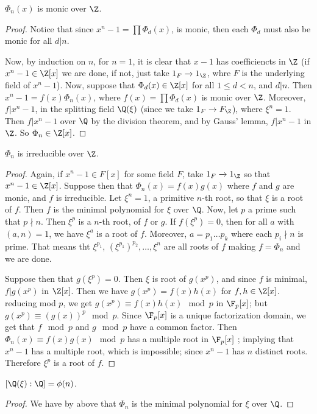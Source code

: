 \begin{lemma}\label{1.7.3}
    $\Phi_n(x)$ is monic over $\Z$.
\end{lemma}
\begin{proof}
    Notice that since $x^n-1=\prod{\Phi_d(x)}$, is monic, then each $\Phi_d$
    must also be monic for all  $d|n$.

    Now, by induction on $n$, for  $n=1$, it is clear that  $x-1$ has
    coefficiencts in  $\Z$  (if $x^n-1 \in \Z[x]$ we are done, if not, just take
    $1_F \xrightarrow{} 1_\Z$, whre $F$ is the underlying field of  $x^n-1$).
    Now, suppose that $\Phi_d(x) \in \Z[x]$ for all $1 \leq d <n$, and  $d|n$.
    Then  $x^n-1=f(x)\Phi_n(x)$, where $f(x)=\prod{\Phi_d(x)}$ is monic over
    $\Z$. Moreover,  $f|x^n-1$, in the splitting field $\Q(\xi)$ (since we take
    $1_F \xrightarrow{} F_\Z$), where $\xi^n=1$. Then  $f|x^n-1$ over  $\Q$ by
    the division theorem, and by Gauss' lemma, $f|x^n-1$ in $\Z$. So $\Phi_n \in
    \Z[x]$.
\end{proof}

\begin{theorem}\label{1.7.4}
    $\Phi_n$ is irreducible over  $\Z$.
\end{theorem}
\begin{proof}
    Again, if $x^n-1 \in F[x]$ for some field $F$, take  $1_F \xrightarrow{}
    1_\Z$ so that $x^n-1 \in \Z[x]$. Suppose then that $\Phi_n(x)=f(x)g(x)$
    where $f$ and  $g$ are monic, and  $f$ is irreducible. Let $\xi^n=1$, a
    primitive $n$-th root, so that $\xi$ is a root of $f$. Then $f$ is the
    minimal polynomial for $\xi$ over  $\Q$. Now, let $p$ a prime such that $p
    \nmid n$. Then $\xi^p$ is a $n$-th root, of $f$ or $g$. If  $f(\xi^p)=0$,
    then for all $a$ with  $(a,n)=1$, we have $\xi^a$ is a root of $f$.
    Moreover,  $a=p_1 \dots p_k$ where each $p_i \nmid n$ is prime. That means
    tht  $\xi^{p_1}$, $(\xi^{p_1})^{p_2}, \dots, \xi^n$ are all roots of $f$
    making  $f=\Phi_n$ and we are done.

    Suppose then that $g(\xi^p)=0$. Then $\xi$ is root of  $g(x^p)$,
    and since $f$ is minimal, $f|g(x^p)$ in $\Z[x]$. Then we have
    $g(x^p)=f(x)h(x)$ for $f,h \in \Z[x]$. reducing mod $p$, we get
    $g(x^p) \equiv f(x)h(x) \mod{p}$ in $\F_p[x]$; but $g(x^p) \equiv (g(x))^p
    \mod{p}$. Since $\F_p[x]$ is a unique factorization domain, we get that $f
    \mod{p}$ and $g \mod{p}$ have a common factor. Then $\Phi_n(x) \equiv
    f(x)g(x) \mod{p}$ has a multiple root in $\F_p[x]$ ; implying that $x^n-1$
    has a multiple root, which is impossible; since $x^n-1$ has  $n$ distinct
    roots. Therefore $\xi^p$ is a root of  $f$.
\end{proof}
\begin{corollary}
    $[\Q(\xi):\Q]=\phi(n)$.
\end{corollary}
\begin{proof}
    We have by above that $\Phi_n$ is the minimal polynomial for  $\xi$ over
    $\Q$.
\end{proof}

